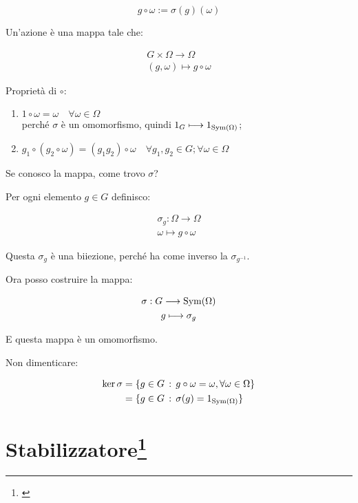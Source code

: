 \begin{equation}
	g \circ \omega := \sigma(g)(\omega)
\end{equation}

Un'azione è una mappa tale che:

\begin{gather}
	G \times \Omega \longrightarrow \Omega \\
	(g, \omega) \longmapsto g \circ \omega
\end{gather}

Proprietà di $\circ$:

\begin{enumerate}
	\item $1 \circ \omega = \omega \quad \forall \omega \in \Omega$ \\
	perché $\sigma$ è un omomorfismo, quindi $1_G \longmapsto 1_{\operatorname{Sym}(\Omega)}$;
	\item $g_1 \circ (g_2 \circ \omega) = (g_1 g_2) \circ \omega \quad \forall g_1, g_2 \in G; \forall \omega \in \Omega$
\end{enumerate}

Se conosco la mappa, come trovo $\sigma$?

Per ogni elemento $g \in G$ definisco:

\begin{gather}
	\sigma_g: \Omega \longrightarrow \Omega \\
	\omega \longmapsto g \circ \omega
\end{gather}

Questa $\sigma_g$ è una biiezione, perché ha come inverso la $\sigma_{g^{-1}}$.

Ora posso costruire la mappa:

\begin{gather}
	\sigma: G \longrightarrow \operatorname{Sym}(\Omega) \\
	g \longmapsto \sigma_g
\end{gather}

E questa mappa è un omomorfismo.

Non dimenticare:

\begin{align}
	\ker \sigma &= \{g \in G \,:\, g \circ \omega = \omega, \forall \omega \in \Omega\} \\
	&= \{g \in G \,:\, \sigma(g) = 1_{\operatorname{Sym}(\Omega)}\}
\end{align}

\section[Stabilizzatore]{Stabilizzatore\footnote{\cite[8 novembre 2021]{lucchini}}}

